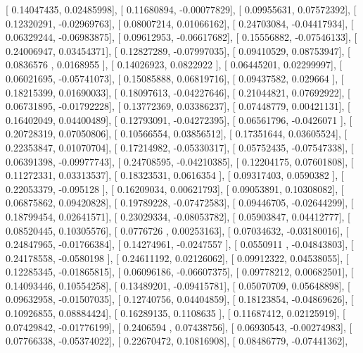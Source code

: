 \documentclass{article}
\begin{document}
       [ 0.14047435,  0.02485998],
       [ 0.11680894, -0.00077829],
       [ 0.09955631,  0.07572392],
       [ 0.12320291, -0.02969763],
       [ 0.08007214,  0.01066162],
       [ 0.24703084, -0.04417934],
       [ 0.06329244, -0.06983875],
       [ 0.09612953, -0.06617682],
       [ 0.15556882, -0.07546133],
       [ 0.24006947,  0.03454371],
       [ 0.12827289, -0.07997035],
       [ 0.09410529,  0.08753947],
       [ 0.0836576 ,  0.0168955 ],
       [ 0.14026923,  0.0822922 ],
       [ 0.06445201,  0.02299997],
       [ 0.06021695, -0.05741073],
       [ 0.15085888,  0.06819716],
       [ 0.09437582,  0.029664  ],
       [ 0.18215399,  0.01690033],
       [ 0.18097613, -0.04227646],
       [ 0.21044821,  0.07692922],
       [ 0.06731895, -0.01792228],
       [ 0.13772369,  0.03386237],
       [ 0.07448779,  0.00421131],
       [ 0.16402049,  0.04400489],
       [ 0.12793091, -0.04272395],
       [ 0.06561796, -0.0426071 ],
       [ 0.20728319,  0.07050806],
       [ 0.10566554,  0.03856512],
       [ 0.17351644,  0.03605524],
       [ 0.22353847,  0.01070704],
       [ 0.17214982, -0.05330317],
       [ 0.05752435, -0.07547338],
       [ 0.06391398, -0.09977743],
       [ 0.24708595, -0.04210385],
       [ 0.12204175,  0.07601808],
       [ 0.11272331,  0.03313537],
       [ 0.18323531,  0.0616354 ],
       [ 0.09317403,  0.0590382 ],
       [ 0.22053379, -0.095128  ],
       [ 0.16209034,  0.00621793],
       [ 0.09053891,  0.10308082],
       [ 0.06875862,  0.09420828],
       [ 0.19789228, -0.07472583],
       [ 0.09446705, -0.02644299],
       [ 0.18799454,  0.02641571],
       [ 0.23029334, -0.08053782],
       [ 0.05903847,  0.04412777],
       [ 0.08520445,  0.10305576],
       [ 0.0776726 ,  0.00253163],
       [ 0.07034632, -0.03180016],
       [ 0.24847965, -0.01766384],
       [ 0.14274961, -0.0247557 ],
       [ 0.0550911 , -0.04843803],
       [ 0.24178558, -0.0580198 ],
       [ 0.24611192,  0.02126062],
       [ 0.09912322,  0.04538055],
       [ 0.12285345, -0.01865815],
       [ 0.06096186, -0.06607375],
       [ 0.09778212,  0.00682501],
       [ 0.14093446,  0.10554258],
       [ 0.13489201, -0.09415781],
       [ 0.05070709,  0.05648898],
       [ 0.09632958, -0.01507035],
       [ 0.12740756,  0.04404859],
       [ 0.18123854, -0.04869626],
       [ 0.10926855,  0.08884424],
       [ 0.16289135,  0.1108635 ],
       [ 0.11687412,  0.02125919],
       [ 0.07429842, -0.01776199],
       [ 0.2406594 ,  0.07438756],
       [ 0.06930543, -0.00274983],
       [ 0.07766338, -0.05374022],
       [ 0.22670472,  0.10816908],
       [ 0.08486779, -0.07441362],
\end{document}
